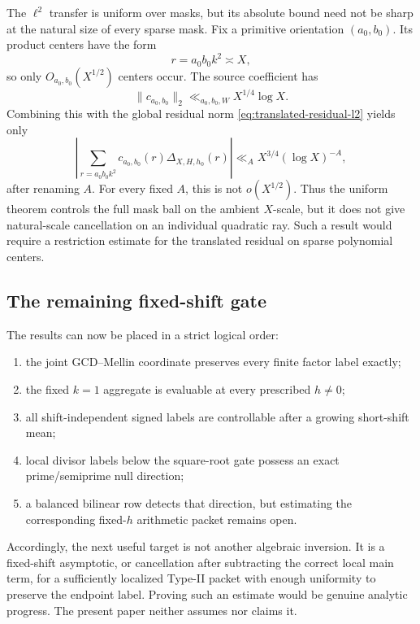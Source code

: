 The $\ell^2$ transfer is uniform over masks, but its absolute bound need
not be sharp at the natural size of every sparse mask.  Fix a primitive
orientation $(a_0,b_0)$.  Its product centers have the form
\begin{equation}
 r=a_0b_0k^2\asymp X,
 \label{eq:quadratic-ray-centers}
\end{equation}
so only $O_{a_0,b_0}(X^{1/2})$ centers occur.  The source coefficient has
\begin{equation}
 \|c_{a_0,b_0}\|_2
 \ll_{a_0,b_0,W}X^{1/4}\log X.
 \label{eq:quadratic-ray-coefficient-norm}
\end{equation}
Combining this with the global residual norm
\eqref{eq:translated-residual-l2} yields only
\begin{equation}
 \left|
 \sum_{r=a_0b_0k^2}c_{a_0,b_0}(r)
 \Delta_{X,H,h_0}(r)
 \right|
 \ll_A X^{3/4}(\log X)^{-A},
 \label{eq:sparse-ray-global-l2-bound}
\end{equation}
after renaming $A$.  For every fixed $A$, this is not $o(X^{1/2})$.
Thus the uniform theorem controls the full mask ball on the ambient
$X$-scale, but it does not give natural-scale cancellation on an
individual quadratic ray.  Such a result would require a restriction
estimate for the translated residual on sparse polynomial centers.

\subsection{The remaining fixed-shift gate}

The results can now be placed in a strict logical order:
\begin{enumerate}[label=\textup{(\arabic*)}]
 \item the joint GCD--Mellin coordinate preserves every finite factor
 label exactly;
 \item the fixed $k=1$ aggregate is evaluable at every prescribed
 $h\ne0$;
 \item all shift-independent signed labels are controllable after a
 growing short-shift mean;
 \item local divisor labels below the square-root gate possess an exact
 prime/semiprime null direction;
 \item a balanced bilinear row detects that direction, but estimating the
 corresponding fixed-$h$ arithmetic packet remains open.
\end{enumerate}

Accordingly, the next useful target is not another algebraic inversion.
It is a fixed-shift asymptotic, or cancellation after subtracting the
correct local main term, for a sufficiently localized Type-II packet with
enough uniformity to preserve the endpoint label.  Proving such an estimate
would be genuine analytic progress.  The present paper neither assumes nor
claims it.
